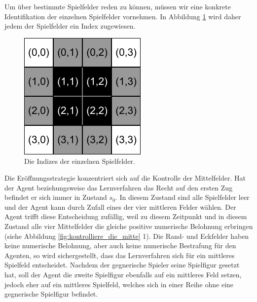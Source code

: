 
Um über bestimmte Spielfelder reden zu können, müssen wir eine konkrete Identifikation der einzelnen Spielfelder vornehmen. In Abbildung \ref{fig:tictactoe_spielfeld_indizes} wird daher jedem der Spielfelder ein Index zugewiesen.

\begin{figure}[!htbp]
  \centering
  \includegraphics[scale = 1]{inhalt/abbildungen/tictactoe_spielfeld_indizes.pdf}
  \caption{Die Indizes der einzelnen Spielfelder.}
  \label{fig:tictactoe_spielfeld_indizes}
\end{figure}

Die Eröffnungsstrategie konzentriert sich auf die Kontrolle der Mittelfelder. Hat der Agent beziehungsweise das Lernverfahren das Recht auf den ersten Zug befindet er sich immer in Zustand $s_0$. In diesem Zustand sind alle Spielfelder leer und der Agent kann durch Zufall eines der vier mittleren Felder wählen. Der Agent trifft diese Entscheidung zufällig, weil zu diesem Zeitpunkt und in diesem Zustand alle vier Mittelfelder die gleiche positive numerische Belohnung erbringen (siehe Abbildung \ref{fig:kontrolliere_die_mitte} 1). Die Rand- und Eckfelder haben keine numerische Belohnung, aber auch keine numerische Bestrafung für den Agenten, so wird sichergestellt, dass das Lernverfahren sich für ein mittleres Spielfeld entscheidet. Nachdem der gegnerische Spieler seine Spielfigur gesetzt hat, soll der Agent die zweite Spielfigur ebenfalls auf ein mittleres Feld setzen, jedoch eher auf ein mittleres Spielfeld, welches sich in einer Reihe ohne eine gegnerische Spielfigur befindet. \\

